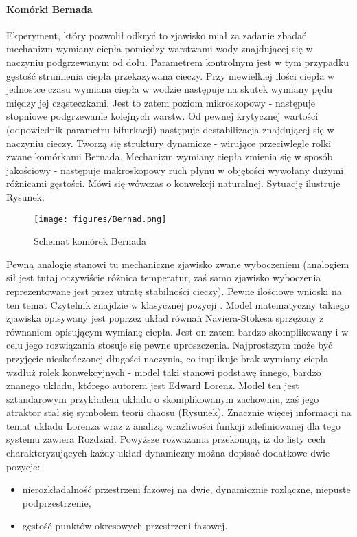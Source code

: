 \documentclass[12pt]{article}
\begin{document}
\paragraph{Komórki Bernada}
Ekperyment, który pozwolił odkryć to zjawisko miał za zadanie zbadać mechanizm wymiany ciepła pomiędzy warstwami wody znajdującej się w naczyniu podgrzewanym od dołu. Parametrem kontrolnym jest w tym przypadku gęstość strumienia ciepła przekazywana cieczy. Przy niewielkiej ilości ciepła w jednostce czasu wymiana ciepła w wodzie następuje na skutek wymiany pędu między jej cząsteczkami. Jest to zatem poziom mikroskopowy - następuje stopniowe podgrzewanie kolejnych warstw. Od pewnej krytycznej wartości (odpowiednik parametru bifurkacji) następuje destabilizacja znajdującej się w naczyniu cieczy. Tworzą się struktury dynamicze - wirujące przeciwlegle rolki zwane komórkami Bernada. Mechanizm wymiany ciepła zmienia się w sposób jakościowy - następuje makroskopowy ruch płynu w objętości wywołany dużymi różnicami gęstości. Mówi się wówczas o konwekcji naturalnej. Sytuację ilustruje Rysunek.
\begin{figure}[H]
	\texttt{[image: figures/Bernad.png]} 
	\centering
	\caption{Schemat komórek Bernada}
\end{figure}
Pewną analogię stanowi tu mechaniczne zjawisko zwane wyboczeniem (analogiem sił jest tutaj oczywiście różnica temperatur, zaś samo zjawisko wyboczenia reprezentowane jest przez utratę stabilności cieczy). Pewne ilościowe wnioski na ten temat Czytelnik znajdzie w klasycznej pozycji \cite{Landau}.\newline
Model matematyczny takiego zjawiska opisywany jest poprzez układ równań Naviera-Stokesa sprzężony z równaniem opisującym wymianę ciepła. Jest on zatem bardzo skomplikowany i w celu jego rozwiązania stosuje się pewne uproszczenia. Najprostszym może być przyjęcie nieskończonej długości naczynia, co implikuje brak wymiany ciepła wzdłuż rolek konwekcyjnych - model taki stanowi podstawę innego, bardzo znanego układu, którego autorem jest Edward Lorenz. Model ten jest sztandarowym przykładem układu o skomplikowanym zachowniu, zaś jego atraktor stał się symbolem teorii chaosu (Rysunek). Znacznie więcej informacji na temat układu Lorenza wraz z analizą wrażliwości funkcji zdefiniowanej dla tego systemu zawiera Rozdział.\newline
Powyższe rozważania przekonują, iż do listy cech charakteryzujących każdy układ dynamiczny można dopisać dodatkowe dwie pozycje:
\begin{itemize}
	\item nierozkładalność przestrzeni fazowej na dwie, dynamicznie rozłączne, niepuste podprzestrzenie,
	\item gęstość punktów okresowych przestrzeni fazowej.
\end{itemize}
\end{document}
